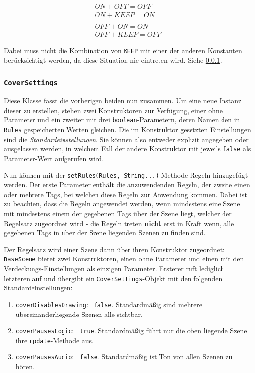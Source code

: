 \begin{sloppypar}
\begin{align*}
	ON + OFF = OFF\\
	ON + KEEP = ON\\
	\\
	OFF + ON = ON\\
	OFF + KEEP = OFF
\end{align*}

Dabei muss nicht die Kombination von \texttt{KEEP} mit einer der anderen
Konstanten berücksichtigt werden, da diese Situation nie eintreten wird.
Siehe \ref{programm:engine:szene:verdecken:CoverSettings}.


\subsubsection{\texttt{CoverSettings}} \label{programm:engine:szene:verdecken:CoverSettings}

Diese Klasse fasst die vorherigen beiden nun zusammen.
Um eine neue Instanz dieser zu erstellen, stehen zwei Konstruktoren zur Verfügung,
einer ohne Parameter und ein zweiter mit drei \texttt{boolean}-Parametern, deren
Namen den in \texttt{Rules} gespeicherten Werten gleichen. Die im Konstruktor
gesetzten Einstellungen sind die \textit{Standardeinstellungen}. Sie können also
entweder explizit angegeben oder ausgelassen werden, in welchem Fall der andere
Konstruktor mit jeweils \texttt{false} als Parameter-Wert aufgerufen wird.

Nun können mit der \texttt{setRules(Rules, String...)}-Methode Regeln hinzugefügt werden.
Der erste Parameter enthält die anzuwendenden Regeln, der zweite einen oder mehrere Tags,
bei welchen diese Regeln zur Anwendung kommen. Dabei ist zu beachten, dass die Regeln
angewendet werden, wenn mindestens eine Szene mit mindestens einem der gegebenen Tags
über der Szene liegt, welcher der Regelsatz zugeordnet wird - die Regeln treten \textbf{nicht}
erst in Kraft wenn, alle gegebenen Tags in über der Szene liegenden Szenen zu finden sind.

Der Regelsatz wird einer Szene dann über ihren Konstruktor zugeordnet: 
\texttt{BaseScene} bietet zwei Konstruktoren, einen ohne Parameter und einen
mit den Verdeckungs-Einstellungen als einzigen Parameter. Ersterer ruft lediglich
letzteren auf und übergibt ein \texttt{CoverSettings}-Objekt mit den folgenden
Standardeinstellungen:

\begin{enumerate}
	\item \texttt{coverDisablesDrawing}: \texttt{ false}. Standardmäßig sind mehrere
	      übereinanderliegende Szenen alle sichtbar.
	\item \texttt{coverPausesLogic}: \texttt{ true}. Standardmäßig führt nur die
	      oben liegende Szene ihre \texttt{update}-Methode aus.
	\item \texttt{coverPausesAudio}: \texttt{ false}. Standardmäßig ist Ton von allen Szenen zu hören.
\end{enumerate}


\end{sloppypar}
